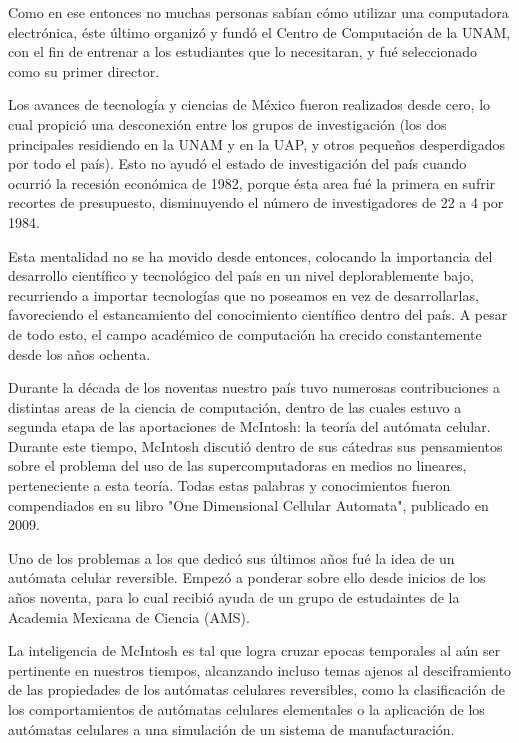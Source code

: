 \documentclass{article}
\begin{document}
Como en ese entonces no muchas personas sabían cómo utilizar una computadora electrónica, éste último organizó y fundó el Centro de Computación de la UNAM, con el fin de entrenar a los estudiantes que lo necesitaran, y fué seleccionado como su primer director.

Los avances de tecnología y ciencias de México fueron realizados desde cero, lo cual propició una desconexión entre los grupos de investigación (los dos principales residiendo en la UNAM y en la UAP, y otros pequeños desperdigados por todo el país). Esto no ayudó el estado de investigación del país cuando ocurrió la recesión económica de 1982, porque ésta area fué la primera en sufrir recortes de presupuesto, disminuyendo el número de investigadores de 22 a 4 por 1984.

Esta mentalidad no se ha movido desde entonces, colocando la importancia del desarrollo científico y tecnológico del país en un nivel deplorablemente bajo, recurriendo a importar tecnologías que no poseamos en vez de desarrollarlas, favoreciendo el estancamiento del conocimiento científico dentro del país. A pesar de todo esto, el campo académico de computación ha crecido constantemente desde los años ochenta.

Durante la década de los noventas nuestro país tuvo numerosas contribuciones a distintas areas de la ciencia de computación, dentro de las cuales estuvo a segunda etapa de las aportaciones de McIntosh: la teoría del autómata celular. Durante este tiempo, McIntosh discutió dentro de sus cátedras sus pensamientos sobre el problema del uso de las supercomputadoras en medios no lineares, perteneciente a esta teoría. Todas estas palabras y conocimientos fueron compendiados en su libro "One Dimensional Cellular Automata", publicado en 2009.

Uno de los problemas a los que dedicó sus últimos años fué la idea de un autómata celular reversible. Empezó a ponderar sobre ello desde inicios de los años noventa, para lo cual recibió ayuda de un grupo de estudaintes de la Academia Mexicana de Ciencia (AMS).

La inteligencia de McIntosh es tal que logra cruzar epocas temporales al aún ser pertinente en nuestros tiempos, alcanzando incluso temas ajenos al desciframiento de las propiedades de los autómatas celulares reversibles, como la clasificación de los comportamientos de autómatas celulares elementales o la aplicación de los autómatas celulares a una simulación de un sistema de manufacturación.
\end{document}
